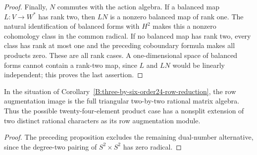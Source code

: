 \begin{proof}
Finally, $N$ commutes with the action algebra.  If a balanced
map $L:V\to W^*$ has rank two, then $LN$ is a nonzero balanced
map of rank one.  The natural identification of balanced forms
with $H^2$ makes this a nonzero cohomology class in the common
radical.  If no balanced map has rank two, every class has rank
at most one and the preceding coboundary formula makes all
products zero.  These are all rank cases.  A one-dimensional
space of balanced forms cannot contain a rank-two map, since
$L$ and $LN$ would be linearly independent; this proves the
last assertion.
\end{proof}

\begin{corollary}\label{B:three-by-six-order24-triangular}
In the situation of
Corollary~\ref{B:three-by-six-order24-row-reduction}, the row
augmentation image is the full triangular two-by-two rational
matrix algebra.  Thus the possible twenty-four-element product
case has a nonsplit extension of two distinct rational characters
as its row augmentation module.
\end{corollary}
\begin{proof}
The preceding proposition excludes the remaining dual-number
alternative, since the degree-two pairing of $S^2\times S^2$
has zero radical.
\end{proof}
